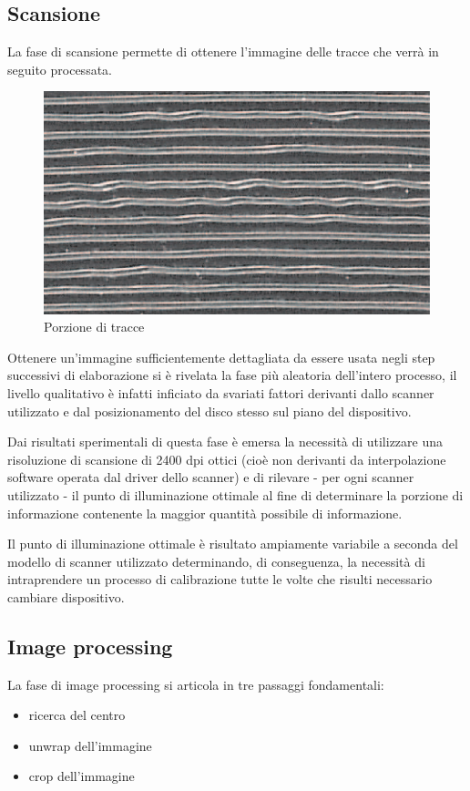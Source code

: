 \subsection{Scansione}
La fase di scansione permette di ottenere l'immagine delle tracce che verr\`a in seguito processata.
\begin{figure}[h!t]
\begin{center}
\includegraphics[scale=0.6]{./img/shellac-track.png}
\caption{Porzione di tracce}
\end{center}
\end{figure}
Ottenere un'immagine sufficientemente dettagliata da essere usata negli step successivi di elaborazione si \`e rivelata la fase pi\`u aleatoria dell'intero processo, il livello qualitativo \`e infatti inficiato da svariati fattori derivanti dallo scanner utilizzato e dal posizionamento del disco stesso sul piano del dispositivo.

Dai risultati sperimentali di questa fase \`e emersa la necessit\`a di utilizzare una risoluzione di scansione di 2400 dpi ottici (cio\`e non derivanti da interpolazione software operata dal driver dello scanner) e di rilevare - per ogni scanner utilizzato - il punto di illuminazione ottimale al fine di determinare la porzione di informazione contenente la maggior quantit\`a possibile di informazione.

Il punto di illuminazione ottimale \`e risultato ampiamente variabile a seconda del modello di scanner utilizzato determinando, di conseguenza, la necessit\`a di intraprendere un processo di calibrazione tutte le volte che risulti necessario cambiare dispositivo.

\subsection{Image processing}
La fase di image processing si articola in tre passaggi fondamentali:
\begin{itemize}
	\item ricerca del centro
	\item unwrap dell'immagine
	\item crop dell'immagine
\end{itemize}

